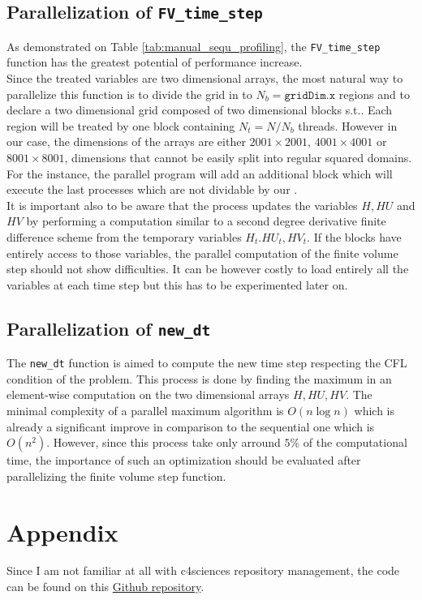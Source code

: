 \documentclass{article}
\begin{document}
\subsection{Parallelization of \texttt{FV\_time\_step}} 
As demonstrated on Table \ref{tab:manual_sequ_profiling}, the \texttt{FV\_time\_step} function has the greatest potential of performance increase.\\ Since the treated variables are two dimensional arrays, the most natural way to parallelize this function is to divide the grid in to $N_b = \texttt{gridDim.x}$ regions and to declare a two dimensional grid composed of two dimensional blocks s.t.. Each region will be treated by one block containing $N_t=N/N_b$ threads. However in our case, the dimensions of the arrays are either $2001\times2001$, $4001\times4001$ or $8001\times8001$, dimensions that cannot be easily split into regular squared domains. For the instance, the parallel program will add an additional block which will execute the last processes which are not dividable by our .\\
It is important also to be aware that the process updates the variables $H,HU$ and $HV$ by performing a computation similar to a second degree derivative finite difference scheme from the temporary variables $H_t.HU_t,HV_t$. If the blocks have entirely access to those variables, the parallel computation of the finite volume step should not show difficulties. It can be however costly to load entirely all the variables at each time step but this has to be experimented later on.

\subsection{Parallelization of \texttt{new\_dt}}
The \texttt{new\_dt} function is aimed to compute the new time step respecting the CFL condition of the problem. This process is done by finding the maximum in an element-wise computation on the two dimensional arrays $H,HU,HV$. The minimal complexity of a parallel maximum algorithm is $O(n\log n)$ which is already a significant improve in comparison to the sequential one which is $O(n^2)$. However, since this process take only arround $5\%$ of the computational time, the importance of such an optimization should be evaluated after parallelizing the finite volume step function.

\section*{Appendix}
Since I am not familiar at all with c4sciences repository management, the code can be found on this \href{https://github.com/Antoinehoff/HPC_Shallow_water}{Github repository}.

\end{document}
